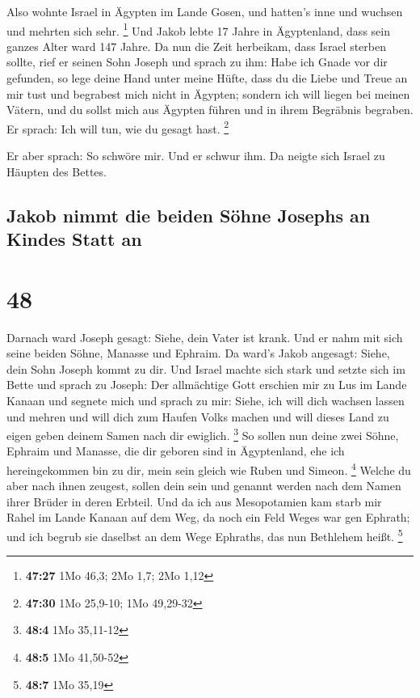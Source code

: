  Also wohnte Israel in Ägypten im Lande Gosen, und
hatten's inne und wuchsen und mehrten sich sehr. \footnote{\textbf{47:27}
  1Mo 46,3; 2Mo 1,7; 2Mo 1,12}  Und Jakob lebte 17 Jahre
in Ägyptenland, dass sein ganzes Alter ward 147 Jahre. 
Da nun die Zeit herbeikam, dass Israel sterben sollte, rief er seinen
Sohn Joseph und sprach zu ihm: Habe ich Gnade vor dir gefunden, so lege
deine Hand unter meine Hüfte, dass du die Liebe und Treue an mir tust
und begrabest mich nicht in Ägypten;  sondern ich will
liegen bei meinen Vätern, und du sollst mich aus Ägypten führen und in
ihrem Begräbnis begraben. Er sprach: Ich will tun, wie du gesagt hast.
\footnote{\textbf{47:30} 1Mo 25,9-10; 1Mo 49,29-32}

 Er aber sprach: So schwöre mir. Und er schwur ihm. Da
neigte sich Israel zu Häupten des Bettes.

\hypertarget{jakob-nimmt-die-beiden-suxf6hne-josephs-an-kindes-statt-an}{%
\subsection{Jakob nimmt die beiden Söhne Josephs an Kindes Statt
an}\label{jakob-nimmt-die-beiden-suxf6hne-josephs-an-kindes-statt-an}}

\hypertarget{section-47}{%
\section{48}\label{section-47}}

 Darnach ward Joseph gesagt: Siehe, dein Vater ist krank.
Und er nahm mit sich seine beiden Söhne, Manasse und Ephraim.
 Da ward's Jakob angesagt: Siehe, dein Sohn Joseph kommt
zu dir. Und Israel machte sich stark und setzte sich im Bette
 und sprach zu Joseph: Der allmächtige Gott erschien mir
zu Lus im Lande Kanaan und segnete mich  und sprach zu
mir: Siehe, ich will dich wachsen lassen und mehren und will dich zum
Haufen Volks machen und will dieses Land zu eigen geben deinem Samen
nach dir ewiglich. \footnote{\textbf{48:4} 1Mo 35,11-12} 
So sollen nun deine zwei Söhne, Ephraim und Manasse, die dir geboren
sind in Ägyptenland, ehe ich hereingekommen bin zu dir, mein sein gleich
wie Ruben und Simeon. \footnote{\textbf{48:5} 1Mo 41,50-52}
 Welche du aber nach ihnen zeugest, sollen dein sein und
genannt werden nach dem Namen ihrer Brüder in deren Erbteil.
 Und da ich aus Mesopotamien kam starb mir Rahel im Lande
Kanaan auf dem Weg, da noch ein Feld Weges war gen Ephrath; und ich
begrub sie daselbst an dem Wege Ephraths, das nun Bethlehem heißt.
\footnote{\textbf{48:7} 1Mo 35,19}

